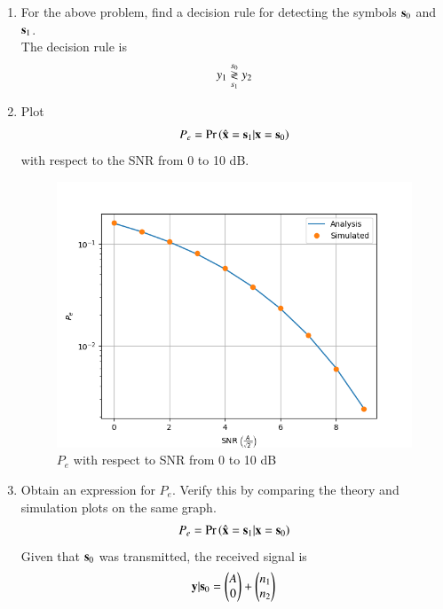 \begin{enumerate}[label=\thesection.\arabic*.,ref=\thesection.\theenumi]
\begin{figure}
\label{fig:scatter_plt_y}
\end{figure}
%
\item
For the above problem, find a decision rule for detecting the symbols $\mathbf{s}_0 $ and $\mathbf{s}_1$.
\\
\solution The decision rule is
\begin{equation}
\label{eq:decision_rule}
y_1 \overset{s_0}{\underset{s_1}{\gtrless}} y_2
\end{equation}
%
\item
Plot 
\begin{equation} 
P_e = \Pr\left(\hat{\mathbf{x}} = \mathbf{s}_1|\mathbf{x} = \mathbf{s}_0\right)
\end{equation}
with respect to the SNR from 0 to 10 dB.
\\
\begin{figure}
\centering
\includegraphics[width=\columnwidth]{./figs/twoD/ber_snr_plot.png}
\caption{$P_e$ with respect to SNR from 0 to 10 dB}
\label{fig:ber_snr_plot}
\end{figure}
%
\item
Obtain an expression for $P_e$. Verify this by comparing the theory and simulation plots on the same graph.
\\
\solution 
\begin{align}
P_e = \Pr\left(\hat{\mathbf{x}} = \mathbf{s}_1|\mathbf{x} = \mathbf{s}_0\right)
\end{align}
Given that $\mathbf{s}_0$ was transmitted, the received signal is
\begin{align}
\mbf{y}|\mbf{s}_0 = \begin{pmatrix} A \\ 0 \end{pmatrix} + \begin{pmatrix} n_1 \\ n_2 \end{pmatrix}

\end{align}
\end{enumerate}
